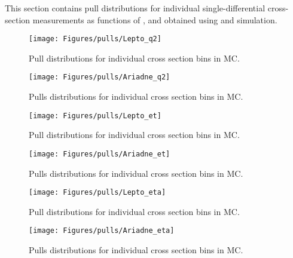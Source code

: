 This section contains pull distributions for individual single-differential cross-section measurements as functions of \qsq, \etjetb and \etajetb obtained using \lepto and \ariadne simulation.
\begin{figure}[p!]
	\centering
		\texttt{[image: Figures/pulls/Lepto\_q2]}
	\caption{Pull distributions for individual \dsdqsq cross section bins in \lepto MC.}
	\label{fig:q2_pulls_ari}
\end{figure}

\begin{figure}[p!]
	\centering
		\texttt{[image: Figures/pulls/Ariadne\_q2]}
	\caption{Pulls distributions for individual \dsdqsq cross section bins in \ariadne MC.}
	\label{fig:q2_pulls_ari}
\end{figure}

\begin{figure}[p!]
	\centering
		\texttt{[image: Figures/pulls/Lepto\_et]}
	\caption{Pull distributions for individual \dsdqsq cross section bins in \lepto MC.}
	\label{fig:et_pulls_lep}
\end{figure}

\begin{figure}[p!]
	\centering
		\texttt{[image: Figures/pulls/Ariadne\_et]}
	\caption{Pulls distributions for individual \dsdetjetb cross section bins in \ariadne MC.}
	\label{fig:et_pulls_ari}
\end{figure}

\begin{figure}[p!]
	\centering
		\texttt{[image: Figures/pulls/Lepto\_eta]}
	\caption{Pull distributions for individual \dsdetajetb cross section bins in \lepto MC.}
	\label{fig:eta_pulls_lep}
\end{figure}

\begin{figure}[p!]
	\centering
		\texttt{[image: Figures/pulls/Ariadne\_eta]}
	\caption{Pulls distributions for individual \dsdetajetb cross section bins in \ariadne MC.}
	\label{fig:eta_pulls_ari}
\end{figure}